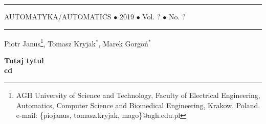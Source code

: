 \documentclass[b5paper,10pt,twoside]{article}
\begin{document}
\thispagestyle{empty}

\hrule

\vspace{2mm}

\noindent
AUTOMATYKA/AUTOMATICS $\bullet$ 2019 $\bullet$ Vol. ? $\bullet$ No. ?

\vspace{2mm}

\hrule

\vspace{22mm}

Piotr Janus\footnote{AGH University of Science and Technology, Faculty of Electrical Engineering, Automatics, Computer Science and Biomedical Engineering, Krakow, Poland. e-mail: \{piojanus, tomasz.kryjak, mago\}@agh.edu.pl}, Tomasz Kryjak$^*$, Marek Gorgoń$^*$

\vspace{9mm}


{\bf\Large Tutaj tytuł\\[2mm] \indent cd}

\vspace{12mm}
\end{document}
